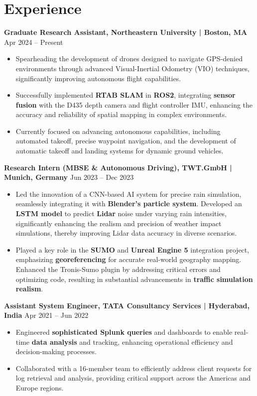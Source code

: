 \documentclass[a4paper,10pt]{article}
\begin{document}
\section*{Experience}
\noindent\textbf{Graduate Research Assistant, Northeastern University | Boston, MA} \hfill Apr 2024 – Present
\begin{itemize}
    \item Spearheading the development of drones designed to navigate GPS-denied environments through advanced Visual-Inertial Odometry (VIO) techniques, significantly improving autonomous flight capabilities.
    \item Successfully implemented \textbf{RTAB SLAM} in \textbf{ROS2}, integrating \textbf{sensor fusion} with the D435 depth camera and flight controller IMU, enhancing the accuracy and reliability of spatial mapping in complex environments.
    \item Currently focused on advancing autonomous capabilities, including automated takeoff, precise waypoint navigation, and the development of automatic takeoff and landing systems for dynamic ground vehicles.
\end{itemize}

\noindent\textbf{Research Intern (MBSE \& Autonomous Driving), TWT.GmbH | Munich, Germany} \hfill Jun 2023 – Dec 2023
\begin{itemize}
    \item Led the innovation of a CNN-based AI system for precise rain simulation, seamlessly integrating it with \textbf{Blender’s particle system}. Developed an \textbf{LSTM model} to predict \textbf{Lidar} noise under varying rain intensities, significantly enhancing the realism and precision of weather impact simulations, thereby improving Lidar data accuracy in diverse scenarios.
    \item Played a key role in the \textbf{SUMO} and \textbf{Unreal Engine 5} integration project, emphasizing \textbf{georeferencing} for accurate real-world geography mapping. Enhanced the Tronis-Sumo plugin by addressing critical errors and optimizing code, resulting in substantial advancements in \textbf{traffic simulation realism}.
\end{itemize}

\noindent\textbf{Assistant System Engineer, TATA Consultancy Services | Hyderabad, India} \hfill Apr 2021 – Jun 2022
\begin{itemize}
    \item Engineered \textbf{sophisticated Splunk queries} and dashboards to enable real-time \textbf{data analysis} and tracking, enhancing operational efficiency and decision-making processes.
    \item Collaborated with a 16-member team to efficiently address client requests for log retrieval and analysis, providing critical support across the Americas and Europe regions.
\end{itemize}
\end{document}
